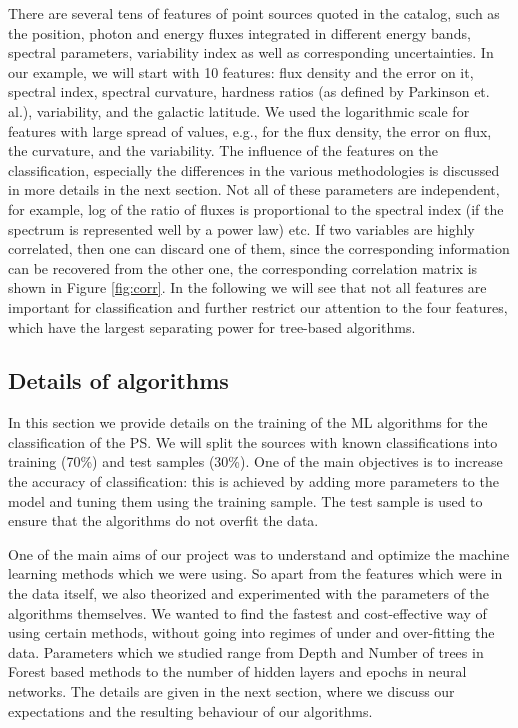 There are several tens of features of point sources quoted in the catalog, such as the position, photon and energy fluxes integrated in different energy bands, spectral parameters, variability index as well as corresponding uncertainties.
In our example, we will start with 10 features:
flux density and the error on it, spectral index, spectral curvature, hardness ratios (as defined by Parkinson et. al.), variability, and the galactic latitude. 
We used the logarithmic scale for features with large spread of values, e.g., for the flux density, the error on flux, the curvature, and the variability. %
The influence of the features on the classification, especially the differences in the various methodologies is discussed in more details in the next section.
Not all of these parameters are independent, for example, log of the ratio of fluxes is proportional to the spectral index (if the spectrum is represented well by a power law) etc.
If two variables are highly correlated, then one can discard one of them, since the corresponding information can be recovered from the other one, the corresponding correlation matrix is shown in Figure \ref{fig:corr}.
In the following we will see that not all features are important for classification and further restrict our attention to the four features, which have the largest separating power for tree-based algorithms.

  

\subsection{Details of algorithms}

In this section we provide details on the training of the ML algorithms for the classification of the PS.
We will split the sources with known classifications into training (70\%) and test samples (30\%).
One of the main objectives is to increase the accuracy of classification: this is achieved by adding more parameters to the model
and tuning them using the training sample.
The test sample is used to ensure that the algorithms do not overfit the data.


One of the main aims of our project was to understand and optimize the machine learning methods which we were using. So apart from the features which were in the data itself, we also theorized and experimented with the parameters of the algorithms themselves. We wanted to find the fastest and cost-effective way of using certain methods, without going into regimes of under and over-fitting the data. Parameters which we studied range from Depth and Number of trees in Forest based methods to the number of hidden layers and epochs in neural networks. The details are given in the next section, where we discuss our expectations and the resulting behaviour of our algorithms.\\


